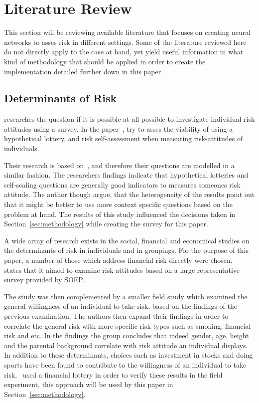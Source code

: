 \documentclass[12pt]{article}
\begin{document}
\section{Literature Review}
\label{sec:literature_review}

This section will be reviewing available literature that focuses on creating neural networks to asses risk in different settings. Some of the literature reviewed here do not directly apply to the case at hand, yet yield useful information in what kind of methodology that should be applied in order to create the implementation detailed further down in this paper.

\subsection{Determinants of Risk}
\label{sub:determinants_riks}
\cite{dp4807.pdf} researches the question if it is possible at all possible to investigate individual risk attitudes using a survey. In the paper~\cite{dp4807.pdf}, try to asses the viability of using a hypothetical lottery, and risk self-assessment when measuring risk-attitudes of individuals. 

Their research is based on~\cite{individualRiskAttitudes}, and therefore their questions are modelled in a similar fashion. The researchers findings indicate that hypothetical lotteries and self-scaling questions are generally good indicators to measures someones risk attitude. The author though argue, that the heterogeneity of the results point out that it might be better to use more context specific questions based on the problem at hand. The results of this study influenced the decisions taken in Section~\ref{sec:methodology} while creating the survey for this paper.

A wide array of research exists in the social, financial and economical studies on the determinants of risk in individuals and in groupings. For the purpose of this paper, a number of those which address financial risk directly were chosen.~\cite{individualRiskAttitudes} states that it aimed to examine risk attitudes based on a large representative survey provided by SOEP\@. 

The study was then complemented by a smaller field study which examined the general willingness of an individual to take risk, based on the findings of the previous examination. The authors then expand their findings in order to correlate the general risk with more specific risk types such as smoking, financial risk and etc. In the findings the group concludes that indeed gender, age, height and the parental background correlate with risk attitude an individual displays. In addition to these determinants, choices such as investment in stocks and doing sports have been found to contribute to the willingness of an individual to take risk.~\cite{individualRiskAttitudes} used a financial lottery in order to verify these results in the field experiment, this approach will be used by this paper in Section~\ref{sec:methodology}.
\end{document}
